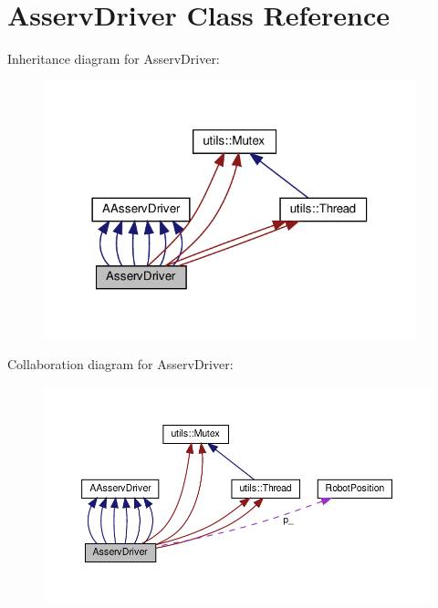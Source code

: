 \hypertarget{classAsservDriver}{}\section{Asserv\+Driver Class Reference}
\label{classAsservDriver}


Inheritance diagram for Asserv\+Driver\+:
\nopagebreak
\begin{figure}[H]
\begin{center}
\leavevmode
\includegraphics[width=306pt]{classAsservDriver__inherit__graph}
\end{center}
\end{figure}


Collaboration diagram for Asserv\+Driver\+:
\nopagebreak
\begin{figure}[H]
\begin{center}
\leavevmode
\includegraphics[width=350pt]{classAsservDriver__coll__graph}
\end{center}
\end{figure}
